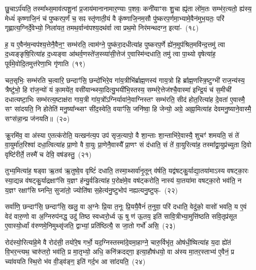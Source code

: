 छु॒चा\-ऽर्प॑यति॒ तस्मा᳚थ्स॒माव॑त्पशू॒नां प्र॒जाय॑मानानामार॒ण्याः प॒शवः॒ कनी॑याꣳसः शु॒चा ह्यृ॑ता लो॑म॒तः सम्भ॑र॒त्यतो॒ ह्य॑स्य॒ मेध्यं॑ कृष्णाजि॒नं च॑ पुष्करप॒र्णं च॒ सꣴ स्तृ॑णाती॒यं वै कृ॑ष्णाजि॒नम॒सौ पु॑ष्करप॒र्णमा॒भ्यामे॒वैन॑मुभ॒यतः॒ परि॑ गृह्णात्य॒ग्निर्दे॒वेभ्यो॒ निला॑यत॒ तमथ॒र्वान्व॑पश्य॒दथ॑र्वा त्वा प्रथ॒मो निर॑मन्थदग्न॒ इत्या॑-~(१८)\ip

ह॒ य ए॒वैन॑म॒न्वप॑श्य॒त्तेनै॒वैन॒ꣳ॒ सम्भ॑रति॒ त्वाम॑ग्ने॒ पुष्क॑रा॒दधीत्या॑ह पुष्करप॒र्णे ह्ये॑न॒मुप॑श्रित॒मवि॑न्द॒त्तमु॑ त्वा द॒ध्यङ्ङृषि॒रित्या॑ह द॒ध्यङ्वा आ॑थर्व॒णस्ते॑ज॒स्व्या॑सी॒त्तेज॑ ए॒वास्मि॑न्दधाति॒ तमु॑ त्वा पा॒थ्यो वृषेत्या॑ह॒ पूर्व॑मे॒वोदि॒तमुत्त॑रेणा॒भि गृ॑णाति~(१९)\ip

चत॒सृभिः॒ सम्भ॑रति च॒त्वारि॒ छन्दाꣳ॑सि॒ छन्दो॑भिरे॒व गा॑य॒त्रीभि॑र्ब्राह्म॒णस्य॑ गाय॒त्रो हि ब्रा᳚ह्म॒णस्त्रि॒ष्टुग्भी॑ राज॒न्य॑स्य॒ त्रैष्टु॑भो॒ हि रा॑ज॒न्यो॑ यं का॒मये॑त॒ वसी॑यान्थ्स्या॒दित्यु॒भयी॑भि॒स्तस्य॒ सम्भ॑रे॒त्तेज॑श्चै॒वास्मा॑ इन्द्रि॒यं च॑ स॒मीची॑ दधात्यष्टा॒भिः सम्भ॑रत्य॒ष्टाक्ष॑रा गाय॒त्री गा॑य॒त्रो᳚\-ऽग्निर्यावा॑ने॒वाग्निस्तꣳ सम्भ॑रति॒ सीद॑ होत॒रित्या॑ह दे॒वता॑ ए॒वास्मै॒ सꣳ सा॑दयति॒ नि होतेति॑ मनु॒ष्या᳚न्थ्सꣳ सी॑द॒स्वेति॒ वयाꣳ॑सि॒ जनि॑ष्वा॒ हि जेन्यो॒ अग्रे॒ अह्ना॒मित्या॑ह देवमनु॒ष्याने॒वास्मै॒ सꣳस॑न्ना॒न्प्र ज॑नयति॥~(२०)\ip

{\anuvakamend[{ऐव प॒शूनिति॑ गृणाति होत॒रिति॑ स॒प्तविꣳ॑शतिश्च}]}

क्रू॒रमि॑व॒ वा अ॑स्या ए॒तत्क॑रोति॒ यत्खन॑त्य॒प उप॑ सृज॒त्यापो॒ वै शा॒न्ताः शा॒न्ताभि॑रे॒वास्यै॒ शुचꣳ॑ शमयति॒ सं ते॑ वा॒युर्मा॑त॒रिश्वा॑ दधा॒त्वित्या॑ह प्रा॒णो वै वा॒युः प्रा॒णेनै॒वास्यै᳚ प्रा॒णꣳ सं द॑धाति॒ सं ते॑ वा॒युरित्या॑ह॒ तस्मा᳚द्\-वा॒युप्र॑च्युता दि॒वो वृष्टि॑रीर्ते॒ तस्मै॑ च देवि॒ वष॑डस्तु॒~(२१)\ip

तुभ्य॒मित्या॑ह॒ षड्वा ऋ॒तव॑ ऋ॒तुष्वे॒व वृष्टिं॑ दधाति॒ तस्मा॒थ्सर्वा॑नृ॒तून् व॑र्\mbox{}षति॒ यद्व॑षट्कु॒र्याद्या॒तया॑माऽस्य वषट्का॒रः स्या॒द्यन्न व॑षट्कु॒र्याद्रक्षाꣳ॑सि य॒ज्ञꣳ ह॑न्यु॒र्वडित्या॑ह प॒रोक्ष॑मे॒व वष॑ट्करोति॒ नास्य॑ या॒तया॑मा वषट्का॒रो भव॑ति॒ न य॒ज्ञꣳ रक्षाꣳ॑सि घ्नन्ति॒ सुजा॑तो॒ ज्योति॑षा स॒हेत्य॑नु॒ष्टुभोप॑ नह्यत्यनु॒ष्टुफ्-~(२२)\ip

सर्वा॑णि॒ छन्दाꣳ॑सि॒ छन्दाꣳ॑सि॒ खलु॒ वा अ॒ग्नेः प्रि॒या त॒नूः प्रि॒ययै॒वैनं॑ त॒नुवा॒ परि॑ दधाति॒ वेदु॑को॒ वासो॑ भवति॒ य ए॒वं वेद॑ वारु॒णो वा अ॒ग्निरुप॑नद्ध॒ उदु॑ तिष्ठ स्वध्वरो॒र्ध्व ऊ॒ षु ण॑ ऊ॒तय॒ इति॑ सावि॒त्रीभ्या॒मुत्ति॑ष्ठति सवि॒तृप्र॑सूत ए॒वास्यो॒र्ध्वां व॑रुणमे॒निमुथ्सृ॑जति॒ द्वाभ्यां॒ प्रति॑ष्ठित्यै॒ स जा॒तो गर्भो॑ असि॒~(२३)\ip

रोद॑स्यो॒रित्या॑हे॒मे वै रोद॑सी॒ तयो॑रे॒ष गर्भो॒ यद॒ग्निस्तस्मा॑दे॒वमा॒हाग्ने॒ चारु॒र्विभृ॑त॒ ओष॑धी॒ष्वित्या॑ह य॒दा ह्ये॑तं वि॒भर॒न्त्यथ॒ चारु॑तरो॒ भव॑ति॒ प्र मा॒तृभ्यो॒ अधि॒ कनि॑क्रदद्गा॒ इत्या॒हौष॑धयो॒ वा अ॑स्य मा॒तर॒स्ताभ्य॑ ए॒वैनं॒ प्र च्या॑वयति स्थि॒रो भ॑व वी॒ड्व॑ङ्ग॒ इति॑ गर्द॒भ आ सा॑दयति॒~(२४)\ip

